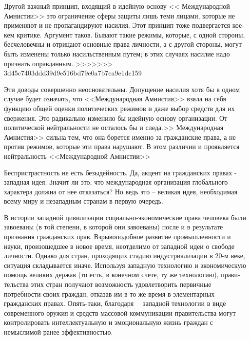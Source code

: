 \documentclass{book}
\begin{document}
{Другой важный принцип, входящий в идейную основу << Меж­дународной Амнистии>> это ограничение сферы защиты лишь теми лицами, которые не применяют и не пропагандируют на­силия. Этот принцип тоже подвергается кое-кем критике. Ар­гумент таков. Бывают такие режимы, которые, с одной сторо­ны, бесчеловечны и отрицают основные права личности, а с другой стороны, могут быть изменены только насильственным путем; в этих случаях насилие надо признать оправданным.
>>>>>>> 3d45c7403ddd39d9e516bd79e0a7b7ca9e1dc159

Эти доводы совершенно неосновательны. Допущение насилия хотя бы в одном случае будет означать, что <<Международная Амнистия>> взяла на себя функцию общей оценки политических режимов и даже выбор средств для их свержения. Это ради­кально изменило бы идейную основу организации. От полити­ческой нейтральности не осталось бы и следа.>> Международная Амнистия>> сильна тем, что она борется именно за гражданские права,  а не против режимов,  которые эти права нарушают. В этом различии и проявляется нейтральность <<Международной Амнистии>>

Беспристрастность не есть безыдейность. Да, акцент на граж­данских правах - западная идея. Значит ли это, что междуна­родная организация глобального характера должна от нее отка­заться? Но ведь это -- великая идея, необходимая всему миру и незападным странам в первую очередь.

В истории западной цивилизации социально-экономические права человека были завоеваны (в той степени, в которой они завоеваны) после и в результате признания гражданских прав. Взрывоподобное развитие промышленности и науки, произо­шедшее в новое время, неотделимо от западной идеи о сво­боде личности. Однако для стран, проходящих стадию инду­стриализации в 20-м веке, ситуация складывается иначе. Исполь­зуя западную технологию и экономическую помощь великих держав (то есть, в конечном счете, ту же технологию), прави­тельства этих стран получают возможность удовлетворить первичные потребности своих граждан, отказав им в то же время в элементарных гражданских правах. Опять-таки, благо­даря   западной технологии в виде современного оружия и средств массовой коммуникации правительства могут кон­тролировать интеллектуальную и эмоциональную жизнь граж­дан с немыслимой ранее эффективностью.

}
\end{document}
